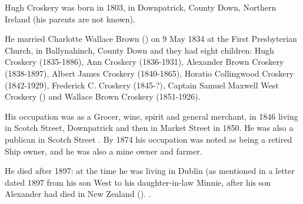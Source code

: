 
Hugh Croskery was born in 1803, in Downpatrick, County Down, Northern Ireland (his parents are not known).

He married Charlotte Wallace Brown () on 9 May 1834 at the First Presbyterian Church, in Ballynahinch, County Down and they had eight children:  Hugh Croskery (1835-1886), Ann Croskery (1836-1931), Alexander Brown Croskery (1838-1897), Albert James Croskery (1840-1865), Horatio Collingwood Croskery (1842-1929), Frederick C. Croskery (1845-?),  Captain Samuel Maxwell West Croskery () and Wallace Brown Croskery (1851-1926). 

His occupation was as a Grocer, wine, spirit and general merchant, in 1846 living in Scotch Street, Downpatrick and then in Market Street in 1850.  He was also a publican in Scotch Street \cite{HughCroskeryOccupation}. By 1874 his occupation was noted as being a retired Ship owner, and he was also a mine owner and farmer. 

He died after 1897: at the time he was living in Dublin (as mentioned in a letter dated 1897 from his son West to his daughter-in-law Minnie, after his son Alexander had died in New Zealand (). \cite{HughCroskeryDeath}.

